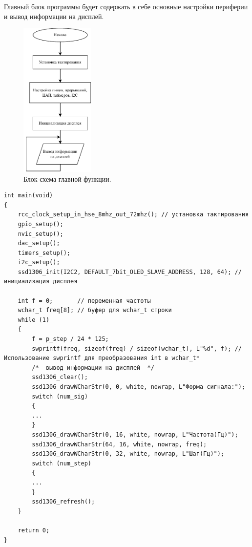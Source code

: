 	Главный блок программы будет содержать в себе основные настройки периферии и вывод информации на дисплей.
	\begin{figure}[H]
    \centering
    \includegraphics[width=0.325\textwidth]{../image/main.pdf}
    \caption{Блок-схема главной функции.}
	\end{figure}
	
\begin{code}
\begin{verbatim}
int main(void)
{
    rcc_clock_setup_in_hse_8mhz_out_72mhz(); // установка тактирования
    gpio_setup();
    nvic_setup();
    dac_setup();
    timers_setup();
    i2c_setup();
    ssd1306_init(I2C2, DEFAULT_7bit_OLED_SLAVE_ADDRESS, 128, 64); // инициализация дисплея

    int f = 0;       // переменная частоты
    wchar_t freq[8]; // буфер для wchar_t строки
    while (1)
    {
        f = p_step / 24 * 125;
        swprintf(freq, sizeof(freq) / sizeof(wchar_t), L"%d", f); // Использование swprintf для преобразования int в wchar_t*
        /*  вывод информации на дисплей  */
        ssd1306_clear();
        ssd1306_drawWCharStr(0, 0, white, nowrap, L"Форма сигнала:");
        switch (num_sig)
        {
        ...
        }
        ssd1306_drawWCharStr(0, 16, white, nowrap, L"Частота(Гц)");
        ssd1306_drawWCharStr(64, 16, white, nowrap, freq);
        ssd1306_drawWCharStr(0, 32, white, nowrap, L"Шаг(Гц)");
        switch (num_step)
        {
        ...
        }
        ssd1306_refresh();
    }

    return 0;
}
\end{verbatim}
\end{code}
	
